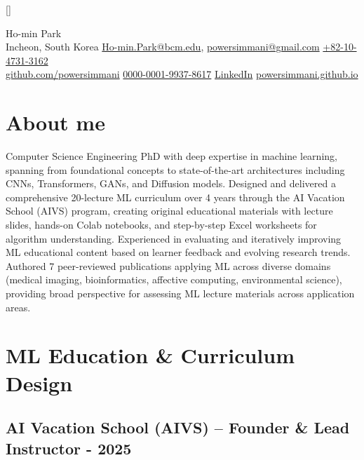 \documentclass[11pt]{article}
\newcommand\ruleafter[1]{#1~\xrfill[.5ex]{1pt}[gr]}
\newif\ifRemVS
\begin{document}
[\global\RemVStrue]
\begin{center}
    {\fontsize{28}{28}\selectfont Ho-min Park} \\
    \bigskip
    {\color{icnclr}\faMapMarker} Incheon, South Korea \quad
    {\color{icnclr}\faEnvelope[regular]} \href{mailto:Ho-min.Park@bcm.edu}{Ho-min.Park@bcm.edu}, \href{mailto:powersimmani@gmail.com}{powersimmani@gmail.com}  \href{tel:+82-10-4731+3162}{+82-10-4731-3162}
    \\
    {\color{icnclr}\faGithub} \href{https://github.com/powersimmani}{github.com/powersimmani}
    \quad{\color{icnclr}\faOrcid} \href{https://orcid.org/0000-0001-9937-8617}{0000-0001-9937-8617}
    \quad{\color{icnclr}\faLinkedin} \href{https://www.linkedin.com/in/park-ho-min-b46658a6}{LinkedIn}
    \quad{\color{icnclr}\faGlobe} \href{https://powersimmani.github.io}{powersimmani.github.io}
\end{center}

\section{About me}
Computer Science Engineering PhD with deep expertise in machine learning, spanning from foundational concepts to state-of-the-art architectures including CNNs, Transformers, GANs, and Diffusion models. Designed and delivered a comprehensive 20-lecture ML curriculum over 4 years through the AI Vacation School (AIVS) program, creating original educational materials with lecture slides, hands-on Colab notebooks, and step-by-step Excel worksheets for algorithm understanding. Experienced in evaluating and iteratively improving ML educational content based on learner feedback and evolving research trends. Authored 7 peer-reviewed publications applying ML across diverse domains (medical imaging, bioinformatics, affective computing, environmental science), providing broad perspective for assessing ML lecture materials across application areas.

\section{ML Education \& Curriculum Design}
\subsection{AI Vacation School (AIVS) -- Founder \& Lead Instructor\hfill {} - 2025}
\end{document}
